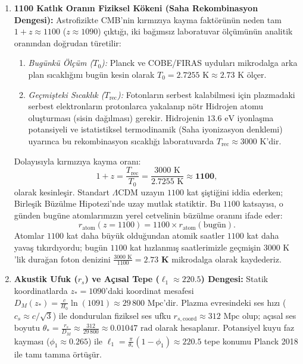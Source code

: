 \begin{enumerate}
    \item \textbf{1100 Katlık Oranın Fiziksel Kökeni (Saha Rekombinasyon Dengesi):}
          Astrofizikte CMB'nin kırmızıya kayma faktörünün neden tam $1+z \approx 1100$ ($z \approx 1090$) çıktığı, iki bağımsız laboratuvar ölçümünün analitik oranından doğrudan türetilir:
          \begin{enumerate}
              \item \textit{Bugünkü Ölçüm ($T_0$):} Planck ve COBE/FIRAS uyduları mikrodalga arka plan sıcaklığını bugün kesin olarak $T_0 = 2.7255\text{ K} \approx 2.73\text{ K}$ ölçer.
              \item \textit{Geçmişteki Sıcaklık ($T_{\mathrm{rec}}$):} Fotonların serbest kalabilmesi için plazmadaki serbest elektronların protonlarca yakalanıp nötr Hidrojen atomu oluşturması (sisin dağılması) gerekir. Hidrojenin $13.6\text{ eV}$ iyonlaşma potansiyeli ve istatistiksel termodinamik (Saha iyonizasyon denklemi) uyarınca bu rekombinasyon sıcaklığı laboratuvarda $T_{\mathrm{rec}} \approx 3000\text{ K}$'dir.
          \end{enumerate}
          Dolayısıyla kırmızıya kayma oranı:
          \begin{equation}
              1 + z = \frac{T_{\mathrm{rec}}}{T_0} = \frac{3000\text{ K}}{2.7255\text{ K}} \approx \mathbf{1100},
              \label{eq:1100_orani_turetilis_monograph}
          \end{equation}
          olarak kesinleşir. Standart $\Lambda$CDM uzayın $1100$ kat şiştiğini iddia ederken; Birleşik Büzülme Hipotezi'nde uzay mutlak statiktir. Bu $1100$ katsayısı, o günden bugüne atomlarımızın yerel cetvelinin büzülme oranını ifade eder:
          \begin{equation}
              r_{\mathrm{atom}}(z=1100) = 1100 \times r_{\mathrm{atom}}(\text{bugün}).
              \label{eq:atom_1100_kati}
          \end{equation}
          Atomlar $1100$ kat daha büyük olduğundan atomik saatler $1100$ kat daha yavaş tıkırdıyordu; bugün $1100$ kat hızlanmış saatlerimizle geçmişin $3000\text{ K}$'lik durağan foton denizini $\frac{3000\text{ K}}{1100} = \mathbf{2.73\text{ K}}$ mikrodalga olarak kaydederiz.

    \item \textbf{Akustik Ufuk ($r_s$) ve Açısal Tepe ($\ell_1 \approx 220.5$) Dengesi:}
          Statik koordinatlarda $z_* = 1090$'daki koordinat mesafesi $D_M(z_*) = \frac{c}{H_0}\ln(1091) \approx 29\,800\text{ Mpc}$'dir. Plazma evresindeki ses hızı ($c_s \approx c/\sqrt{3}$) ile dondurulan fiziksel ses ufku $r_{s,\mathrm{coord}} \approx 312\text{ Mpc}$ olup; açısal ses boyutu $\theta_* = \frac{r_s}{D_M} \approx \frac{312}{29\,800} \approx 0.01047\text{ rad}$ olarak hesaplanır. Potansiyel kuyu faz kayması ($\phi_1 \approx 0.265$) ile $\ell_1 = \frac{\pi}{\theta_*}(1 - \phi_1) \approx \mathbf{220.5}$ tepe konumu Planck 2018 ile tamı tamına örtüşür.
\end{enumerate}


